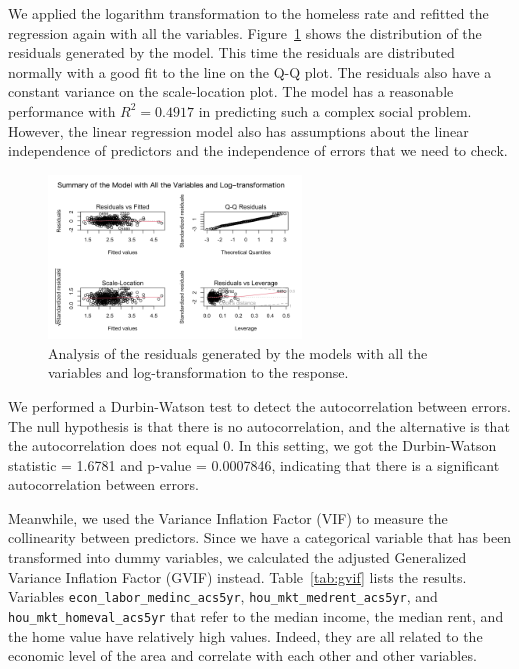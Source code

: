 \documentclass[12pt]{article}
\begin{document}
We applied the logarithm transformation to the homeless rate and refitted the regression again with all the variables. Figure~\ref{fig:log} shows the distribution of the residuals generated by the model. This time the residuals are distributed normally with a good fit to the line on the Q-Q plot. The residuals also have a constant variance on the scale-location plot. The model has a reasonable performance with $R^2 = 0.4917$ in predicting such a complex social problem. However, the linear regression model also has assumptions about the linear independence of predictors and the independence of errors that we need to check. 

\begin{figure}[htp]
    \centering
    \includegraphics[width = 0.6\textwidth]{log.png}
    \caption{Analysis of the residuals generated by the models with all the variables and log-transformation to the response.}
    \label{fig:log}
\end{figure}

We performed a Durbin-Watson test to detect the autocorrelation between errors. The null hypothesis is that there is no autocorrelation, and the alternative is that the autocorrelation does not equal 0. In this setting, we got the Durbin-Watson statistic = 1.6781 and p-value = 0.0007846, indicating that there is a significant autocorrelation between errors.

Meanwhile, we used the Variance Inflation Factor (VIF) to measure the collinearity between predictors. Since we have a categorical variable that has been transformed into dummy variables, we calculated the adjusted Generalized Variance Inflation Factor (GVIF) instead. Table~\ref{tab:gvif} lists the results. Variables \texttt{econ\_labor\_medinc\_acs5yr}, \texttt{hou\_mkt\_medrent\_acs5yr}, and \texttt{hou\_mkt\_homeval\_acs5yr} that refer to the median income, the median rent, and the home value have relatively high values. Indeed, they are all related to the economic level of the area and correlate with each other and other variables.
\end{document}
